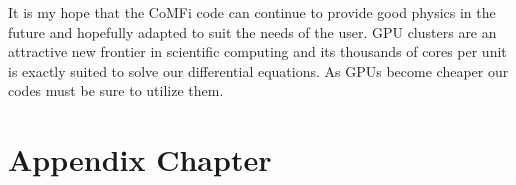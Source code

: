 \documentclass[12pt,upcase]{umlthesis}
\begin{document}
It is my hope that the CoMFi code can continue to provide good physics in the future and hopefully adapted to suit the needs of the user. GPU clusters are an attractive new frontier in scientific computing and its thousands of cores per unit is exactly suited to solve our differential equations. As GPUs become cheaper our codes must be sure to utilize them.

\nocite{*}



\appendix
\chapter{Appendix Chapter}
\end{document}
